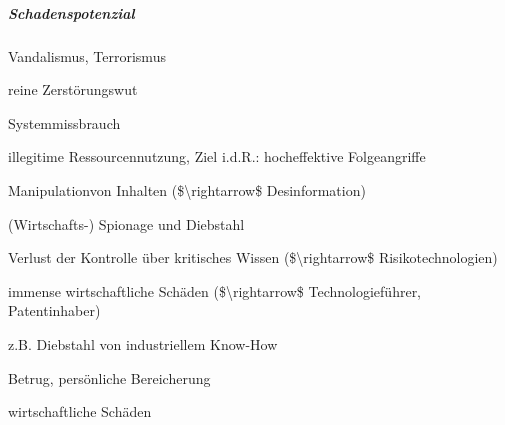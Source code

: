 \documentclass[a4paper]{article}
\begin{document}
\begin{multicols}{3}
    \subparagraph{Schadenspotenzial}

    \begin{enumerate*}
        \item
        Vandalismus, Terrorismus
    \end{enumerate*}

    \begin{itemize*}
        \item
        reine Zerstörungswut
    \end{itemize*}

    \begin{enumerate*}
        \setcounter{enumi}{1}
        \item
        Systemmissbrauch
    \end{enumerate*}

    \begin{itemize*}
        \item
        illegitime Ressourcennutzung, Ziel i.d.R.: hocheffektive Folgeangriffe
        \item
        Manipulationvon Inhalten (\$\textbackslash rightarrow\$
        Desinformation)
    \end{itemize*}

    \begin{enumerate*}
        \setcounter{enumi}{2}
        \item
              (Wirtschafts-) Spionage und Diebstahl
    \end{enumerate*}

    \begin{itemize*}
        \item
        Verlust der Kontrolle über kritisches Wissen
        (\$\textbackslash rightarrow\$ Risikotechnologien)
        \item
        immense wirtschaftliche Schäden (\$\textbackslash rightarrow\$
        Technologieführer, Patentinhaber)
        \item
        z.B. Diebstahl von industriellem Know-How
    \end{itemize*}

    \begin{enumerate*}
        \setcounter{enumi}{3}
        \item
        Betrug, persönliche Bereicherung
    \end{enumerate*}

    \begin{itemize*}
        \item
        wirtschaftliche Schäden
    \end{itemize*}


\end{multicols}
\end{document}
